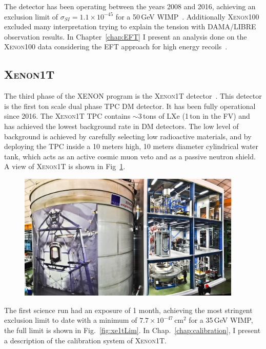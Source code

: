 The detector has been operating between the years 2008 and 2016, achieving an exclusion limit of $\sigma_{SI} = 1.1 \times 10^{-45}$ for a 50\,GeV WIMP~\cite{xe100_run_combination}. Additionally \textsc{Xenon100} excluded many interpretation trying to explain the tension with DAMA/LIBRE observation results. In Chapter~\ref{chap:EFT} I present an analysis done on the \textsc{Xenon100} data considering the EFT approach for high energy recoils~\cite{Aprile:2017aas}.  

\subsection{\textsc{Xenon1T}}
\label{sec:xe1T}

The third phase of the XENON program is the \textsc{Xenon1T} detector~\cite{Aprile:2017aty}. This detector is the first ton scale dual phase TPC  DM detector. It has been fully operational since 2016. The \textsc{Xenon1T} TPC contains $\sim 3$\,tons of LXe (1\,ton in the FV) and has achieved the lowest background rate in DM detectors. The low level of background is achieved by carefully selecting low radioactive materials, and by deploying the TPC inside a 10 meters high, 10 meters diameter cylindrical water tank, which acts as an active cosmic muon veto and as a passive neutron shield. A view of \textsc{Xenon1T} is shown in Fig~\ref{fig:xe1tpic}.

\begin{figure}[]
	\centering
	\includegraphics[width=0.95\textwidth]{figs/xe1tImg.png}
	\label{fig:xe1tpic}
\end{figure}

The first science run had an exposure of 1 month, achieving the most stringent  exclusion limit to date with a minimum of $7.7\times10^{-47}$\,cm$^2$ for a 35\,GeV WIMP, the full limit is shown in Fig.~\ref{fig:xe1tLim}. In Chap.~\ref{chap:calibration}, I present a description of the calibration system of \textsc{Xenon1T}.
 
